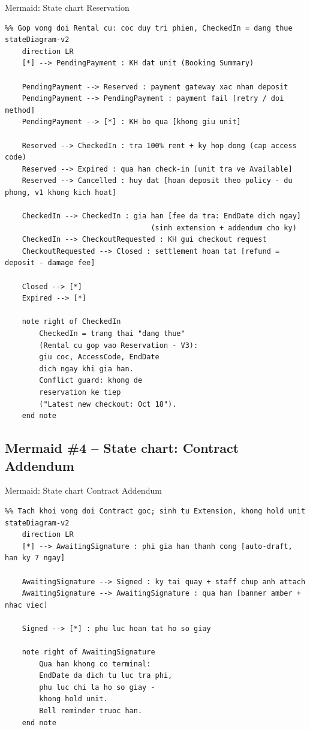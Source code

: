 \documentclass[12pt,a4paper]{article}
\renewcommand{\_}{\textunderscore\allowbreak}
\begin{document}
\begin{mermaidbox}{Mermaid: State chart Reservation}
\begin{Verbatim}[fontsize=\small]
%% StorageHub - State chart: vong doi Reservation (BK-) - V3 2026-09-18
%% Gop vong doi Rental cu: coc duy tri phien, CheckedIn = dang thue
stateDiagram-v2
    direction LR
    [*] --> PendingPayment : KH dat unit (Booking Summary)

    PendingPayment --> Reserved : payment gateway xac nhan deposit
    PendingPayment --> PendingPayment : payment fail [retry / doi method]
    PendingPayment --> [*] : KH bo qua [khong giu unit]

    Reserved --> CheckedIn : tra 100% rent + ky hop dong (cap access code)
    Reserved --> Expired : qua han check-in [unit tra ve Available]
    Reserved --> Cancelled : huy dat [hoan deposit theo policy - du phong, v1 khong kich hoat]

    CheckedIn --> CheckedIn : gia han [fee da tra: EndDate dich ngay]
                                  (sinh extension + addendum cho ky)
    CheckedIn --> CheckoutRequested : KH gui checkout request
    CheckoutRequested --> Closed : settlement hoan tat [refund = deposit - damage fee]

    Closed --> [*]
    Expired --> [*]

    note right of CheckedIn
        CheckedIn = trang thai "dang thue"
        (Rental cu gop vao Reservation - V3):
        giu coc, AccessCode, EndDate
        dich ngay khi gia han.
        Conflict guard: khong de
        reservation ke tiep
        ("Latest new checkout: Oct 18").
    end note
\end{Verbatim}
\end{mermaidbox}

\subsection{Mermaid \#4 -- State chart: Contract Addendum}

\begin{mermaidbox}{Mermaid: State chart Contract Addendum}
\begin{Verbatim}[fontsize=\small]
%% StorageHub - State chart: vong doi Contract Addendum (CT-...-A1) - V3 2026-09-18
%% Tach khoi vong doi Contract goc; sinh tu Extension, khong hold unit
stateDiagram-v2
    direction LR
    [*] --> AwaitingSignature : phi gia han thanh cong [auto-draft, han ky 7 ngay]

    AwaitingSignature --> Signed : ky tai quay + staff chup anh attach
    AwaitingSignature --> AwaitingSignature : qua han [banner amber + nhac viec]

    Signed --> [*] : phu luc hoan tat ho so giay

    note right of AwaitingSignature
        Qua han khong co terminal:
        EndDate da dich tu luc tra phi,
        phu luc chi la ho so giay -
        khong hold unit.
        Bell reminder truoc han.
    end note
\end{Verbatim}
\end{mermaidbox}
\end{document}
